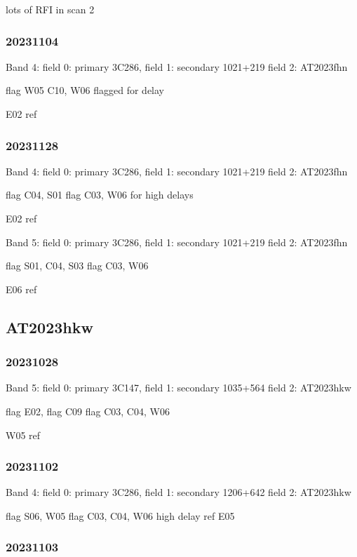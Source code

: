 \documentclass[twocolumn,twocolappendix]{aastex631}
\begin{document}
lots of RFI in scan 2

\subsubsection{20231104} %


Band 4:
field 0: primary 3C286,
field 1: secondary 1021+219
field 2: AT2023fhn

flag W05
C10, W06 flagged for delay

E02 ref

\subsubsection{20231128} 


Band 4:
field 0: primary 3C286,
field 1: secondary 1021+219
field 2: AT2023fhn

flag C04, S01
flag C03, W06 for high delays

E02 ref

Band 5:
field 0: primary 3C286,
field 1: secondary 1021+219
field 2: AT2023fhn

flag S01, C04, S03
flag C03, W06

E06 ref



\subsection{AT2023hkw}

\subsubsection{20231028}

Band 5:
field 0: primary 3C147,
field 1: secondary 1035+564
field 2: AT2023hkw

flag E02, 
flag C09
flag C03, C04, W06

W05 ref

\subsubsection{20231102}

Band 4:
field 0: primary 3C286,
field 1: secondary 1206+642
field 2: AT2023hkw

flag S06, W05
flag C03, C04, W06 high delay
ref E05

\subsubsection{20231103}
\end{document}

